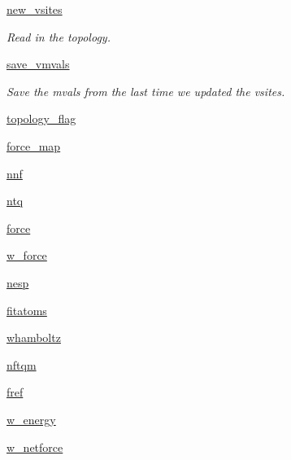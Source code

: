 \begin{DoxyCompactItemize}
\hyperlink{classforcebalance_1_1abinitio_1_1AbInitio_abab8d9c8cbf4eddc5a3c10b6240423e6}{new\-\_\-vsites}
\begin{DoxyCompactList}\small\item\em \-Read in the topology. \end{DoxyCompactList}\item 
\hyperlink{classforcebalance_1_1abinitio_1_1AbInitio_a430661954fff8c1979eb9ac28523bb5e}{save\-\_\-vmvals}
\begin{DoxyCompactList}\small\item\em \-Save the mvals from the last time we updated the vsites. \end{DoxyCompactList}\item 
\hyperlink{classforcebalance_1_1abinitio_1_1AbInitio_a32164696f808febd50eafae10d10a7e7}{topology\-\_\-flag}
\item 
\hyperlink{classforcebalance_1_1abinitio_1_1AbInitio_ab5b58642be0ba7651c16031f955189dc}{force\-\_\-map}
\item 
\hyperlink{classforcebalance_1_1abinitio_1_1AbInitio_aa4eadda3b8377b783dec2d327cb66fa6}{nnf}
\item 
\hyperlink{classforcebalance_1_1abinitio_1_1AbInitio_a88902db5981ca2088a7cf47f5f9aa83a}{ntq}
\item 
\hyperlink{classforcebalance_1_1abinitio_1_1AbInitio_a54baa14272a2312e0fe1b77a0554c0aa}{force}
\item 
\hyperlink{classforcebalance_1_1abinitio_1_1AbInitio_a2f68f2c95e481c03e05b03d55851107f}{w\-\_\-force}
\item 
\hyperlink{classforcebalance_1_1abinitio_1_1AbInitio_a15710ca46f6141a6e5b00a382aa56632}{nesp}
\item 
\hyperlink{classforcebalance_1_1abinitio_1_1AbInitio_a2fba4108ea80f3e1f44cf4c96cd6d530}{fitatoms}
\item 
\hyperlink{classforcebalance_1_1abinitio_1_1AbInitio_a8f3cbe570dfaf74f84f71817cd3fb008}{whamboltz}
\item 
\hyperlink{classforcebalance_1_1abinitio_1_1AbInitio_add8cbee2d95e5702d7a0d1538f26539a}{nftqm}
\item 
\hyperlink{classforcebalance_1_1abinitio_1_1AbInitio_a89697453350c3013d227c3037608d51f}{fref}
\item 
\hyperlink{classforcebalance_1_1abinitio_1_1AbInitio_ab8c3b9a3e74ced53cc5f4e6f3c6c06ef}{w\-\_\-energy}
\item 
\hyperlink{classforcebalance_1_1abinitio_1_1AbInitio_aa9fa8ad127d442e9b545088eb741b9eb}{w\-\_\-netforce}
\item 

\end{DoxyCompactItemize}
